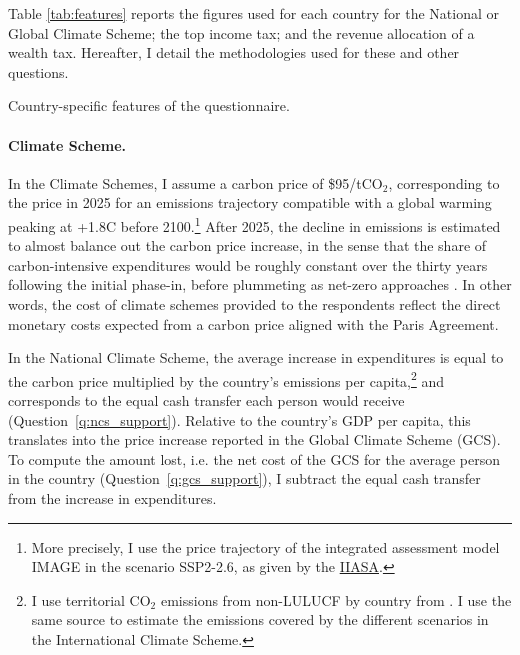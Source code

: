
Table \ref{tab:features} reports the figures used for each country for the National or Global Climate Scheme; the top income tax; and the revenue allocation of a wealth tax. Hereafter, I detail the methodologies used for these and other questions. 

\begin{table}[!h]
\caption[Country-specific features]{\hypertarget{tab_features}{Country-specific features of the questionnaire}.}\label{tab:features}
\makebox[\textwidth][c]{}
\end{table}

\paragraph{Climate Scheme.} 

In the Climate Schemes, I assume a carbon price of \$95/tCO$_\text{2}$, corresponding to the price in 2025 for an emissions trajectory compatible with a global warming peaking at +1.8\textdegree{}C before 2100.\footnote{More precisely, I use the price trajectory of the integrated assessment model IMAGE in the scenario SSP2-2.6, as given by the \href{https://secure.iiasa.ac.at/web-apps/ene/SspDb/download/iam_v2/SSP_IAM_V2_201811.csv.zip}{IIASA}.} 
After 2025, the decline in emissions is estimated to almost balance out the carbon price increase, in the sense that the share of carbon-intensive expenditures would be roughly constant over the thirty years following the initial phase-in, before plummeting as net-zero approaches \citep{fabre_global_2024}. In other words, the cost of climate schemes provided to the respondents reflect the direct monetary costs expected from a carbon price aligned with the Paris Agreement.  

In the National Climate Scheme, the average increase in expenditures is equal to the carbon price multiplied by the country's emissions per capita,\footnote{I use territorial CO$_\text{2}$ emissions from non-LULUCF by country from \cite{gutschow_country-resolved_2021}. I use the same source to estimate the emissions covered by the different scenarios in the International Climate Scheme.} and corresponds to the equal cash transfer each person would receive (Question~\ref{q:ncs_support}). Relative to the country's GDP per capita, this translates into the price increase reported in the Global Climate Scheme (GCS). To compute the amount lost, i.e. the net cost of the GCS for the average person in the country (Question~\ref{q:gcs_support}), I subtract the equal cash transfer from the increase in expenditures. 

